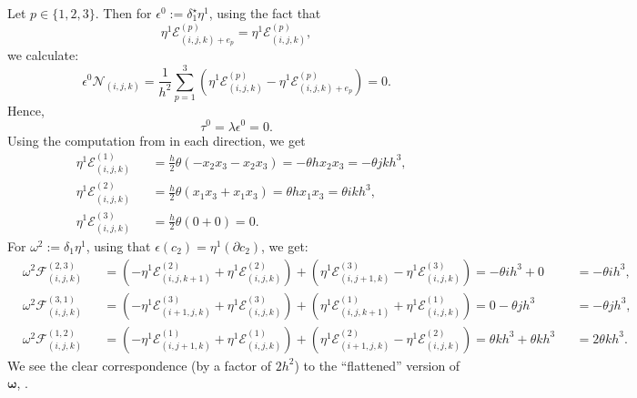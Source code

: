 \begin{example}
  Let $p \in \{1, 2, 3\}$.
  Then for $\epsilon^0 := \delta_1^\star \eta^1$, using the fact that
  \begin{equation}
    \eta^1 \mathcal{E}^{(p)}_{(i, j, k) + e_p} =
    \eta^1 \mathcal{E}^{(p)}_{(i, j, k)},
  \end{equation}
  we calculate:
  \begin{equation}
    \epsilon^0 \mathcal{N}_{(i, j, k)}
    =
      \frac{1}{h^2}
      \sum_{p = 1}^3 (
          \eta^1 \mathcal{E}^{(p)}_{(i, j, k)}
        - \eta^1 \mathcal{E}^{(p)}_{(i, j, k) + e_p}
      )
    = 0.
  \end{equation}
  Hence,
  \begin{equation}
    \tau^0 = \lambda \epsilon^0 = 0.
  \end{equation}
  Using the computation from
  in each direction, we get
  \begin{subequations}
    \begin{alignat}{2}
      & \eta^1 \mathcal{E}^{(1)}_{(i, j, k)} &&
        = \frac{h}{2} \theta (-x_2 x_3 - x_2 x_3)
        = - \theta h x_2 x_3
        = - \theta j k h^3, \\
      & \eta^1 \mathcal{E}^{(2)}_{(i, j, k)} &&
        = \frac{h}{2} \theta (x_1 x_3 + x_1 x_3)
        = \theta h x_1 x_3
        = \theta i k h^3, \\
      & \eta^1 \mathcal{E}^{(3)}_{(i, j, k)} &&
        = \frac{h}{2} \theta (0 + 0)
        = 0.
    \end{alignat}
  \end{subequations}
  For $\omega^2 := \delta_1 \eta^1$, using that
  $\epsilon(c_2) = \eta^1(\partial c_2)$, we get:
  \begin{subequations}
    \begin{alignat}{3}
      & \omega^2 \mathcal{F}^{(2, 3)}_{(i, j, k)}
      && =
        ( - \eta^1 \mathcal{E}^{(2)}_{(i, j, k + 1)}
          + \eta^1 \mathcal{E}^{(2)}_{(i, j, k)}
        )
      + ( \eta^1 \mathcal{E}^{(3)}_{(i, j + 1, k)}
          - \eta^1 \mathcal{E}^{(3)}_{(i, j, k)}
        )
      = - \theta i h^3 + 0
      && = - \theta i h^3, \\
%
      & \omega^2 \mathcal{F}^{(3, 1)}_{(i, j, k)}
      && =
        ( - \eta^1 \mathcal{E}^{(3)}_{(i + 1, j, k)}
          + \eta^1 \mathcal{E}^{(3)}_{(i, j, k)}
        )
      + ( \eta^1 \mathcal{E}^{(1)}_{(i, j, k + 1)}
          + \eta^1 \mathcal{E}^{(1)}_{(i, j, k)}
        )
      = 0 - \theta j h^3
      && = - \theta j h^3, \\
%
      & \omega^2 \mathcal{F}^{(1, 2)}_{(i, j, k)}
      && =
        ( - \eta^1 \mathcal{E}^{(1)}_{(i, j + 1, k)}
          + \eta^1 \mathcal{E}^{(1)}_{(i, j, k)}
        )
      + ( \eta^1 \mathcal{E}^{(2)}_{(i + 1, j, k)}
          - \eta^1 \mathcal{E}^{(2)}_{(i, j, k)}
        )
      = \theta k h^3 + \theta k h^3
      && = 2 \theta k h^3.
    \end{alignat}
  \end{subequations}
  We see the clear correspondence (by a factor of $2 h^2$) to the ``flattened''
  version of $\boldsymbol{\omega}$,
  .


\end{example}
